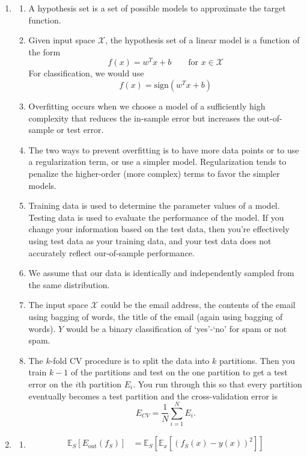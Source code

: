 \documentclass[12pt]{article}
\newcommand{\E}{\mathbb E}
\newcommand{\Eout}{E_{\text{out}}}
\begin{document}
\begin{enumerate}[leftmargin=*]
\item
\begin{enumerate}[label = \Alph*.]
\item A hypothesis set is a set of possible models to approximate the target function.
\item Given input space $\mathcal X$, the hypothesis set of a linear model is a function of the form
\[ f(x) = w^T x + b \qquad \text{for } x \in \mathcal X\]
For classification, we would use
\[ f(x) = \text{sign}(w^T x + b) \]
\item Overfitting occurs when we choose a model of a sufficiently high complexity that reduces the in-sample error but increases the out-of-sample or test error.
\item The two ways to prevent overfitting is to have more data points or to use a regularization term, or use a simpler model. Regularization tends to penalize the higher-order (more complex) terms to favor the simpler models.
\item Training data is used to determine the parameter values of a model. Testing data is used to evaluate the performance of the model. If you change your information based on the test data, then you're effectively using test data as your training data, and your test data does not accurately reflect our-of-sample performance.
\item We assume that our data is identically and independently sampled from the same distribution.
\item The input space $\mathcal X$ could be the email address, the contents of the email using bagging of words, the title of the email (again using bagging of words). $Y$ would be a binary classification of `yes'-`no' for spam or not spam.
\item The $k$-fold CV procedure is to split the data into $k$ partitions. Then you train $k - 1$ of the partitions and test on the one partition to get a test error on the $i$th partition $E_i$. You run through this so that every partition eventually becomes a test partition and the cross-validation error is
\[ E_{CV} = \frac{1}{N} \sum_{i = 1}^N E_i. \]
\end{enumerate}
\item
\begin{enumerate}[label = \Alph*.]
\item 
\begin{align*}
\E_S [\Eout (f_S)] &= \E_S \left[ \E_x \left[ (f_S(x) - y(x))^2 \right] \right] \\

\end{align*}
\end{enumerate}
\end{enumerate}
\end{document}
